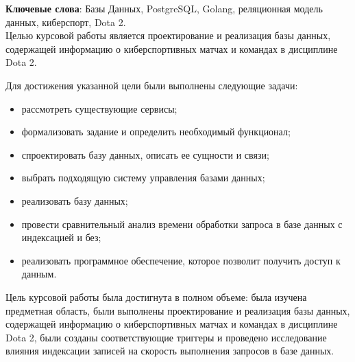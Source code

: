 \begin{essay}{}
    \noindent\textbf{Ключевые слова}: Базы Данных, PostgreSQL, Golang, реляционная модель данных, киберспорт, Dota 2.\\
    
    Целью курсовой работы является проектирование и реализация базы данных, содержащей информацию о киберспортивных матчах и командах в дисциплине Dota 2.
  
	Для достижения указанной цели были выполнены следующие задачи:
	\begin{itemize}
		\item рассмотреть существующие сервисы;
		\item формализовать задание и определить необходимый функционал;
  	\item спроектировать базу данных, описать ее сущности и связи;
		\item выбрать подходящую систему управления базами данных;
        \item реализовать базу данных;
        \item провести сравнительный анализ времени обработки запроса в базе данных с индексацией и без;
		\item реализовать программное обеспечение, которое позволит получить доступ к данным.
	\end{itemize}
    
   Цель курсовой работы была достигнута в полном объеме: была изучена предметная область, были выполнены проектирование и реализация базы данных, содержащей информацию о киберспортивных матчах и командах в дисциплине Dota 2, были созданы соответствующие триггеры и проведено исследование влияния индексации записей на скорость выполнения запросов в базе данных.
\end{essay}